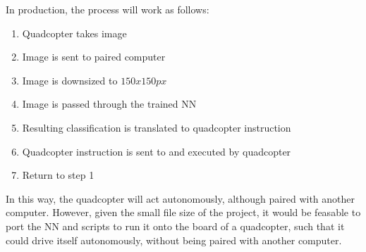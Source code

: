 \documentclass[12pt]{article}
\begin{document}
{	\quad In production, the process will work as follows:
	
	\begin{enumerate}
		\item{Quadcopter takes image}
		\item{Image is sent to paired computer}
		\item{Image is downsized to $150x150px$}
		\item{Image is passed through the trained NN}
		\item{Resulting classification is translated to quadcopter instruction}
		\item{Quadcopter instruction is sent to and executed by quadcopter}	
		\item{Return to step 1}
	\end{enumerate}
	
	\quad In this way, the quadcopter will act autonomously, although paired with another computer. 
	However, given the small file size of the project, it would be feasable to port the NN and scripts to run it onto the board of a quadcopter, such that it could drive itself autonomously, without being paired with another computer.

}
\end{document}
